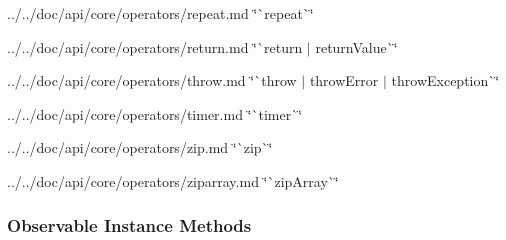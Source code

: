 \begin{DoxyItemize}
\item ../../doc/api/core/operators/repeat.md \char`\"{}\`{}repeat\`{}\char`\"{}
\item ../../doc/api/core/operators/return.md \char`\"{}\`{}return $\vert$ return\+Value\`{}\char`\"{}
\item ../../doc/api/core/operators/throw.md \char`\"{}\`{}throw $\vert$ throw\+Error $\vert$ throw\+Exception\`{}\char`\"{}
\item ../../doc/api/core/operators/timer.md \char`\"{}\`{}timer\`{}\char`\"{}
\item ../../doc/api/core/operators/zip.md \char`\"{}\`{}zip\`{}\char`\"{}
\item ../../doc/api/core/operators/ziparray.md \char`\"{}\`{}zip\+Array\`{}\char`\"{}
\end{DoxyItemize}

\subsubsection*{{\ttfamily Observable Instance Methods}}


